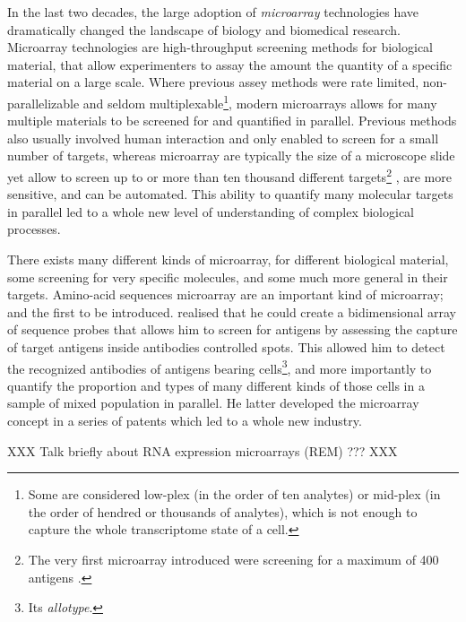 	In the last two decades, the large adoption of \emph{microarray} technologies have dramatically changed the landscape of biology and biomedical research.
	Microarray technologies are high-throughput screening methods for biological material, that allow experimenters to assay the amount the quantity of a specific material on a large scale.
	Where previous assey methods were rate limited, non-parallelizable and seldom multiplexable\footnote{Some are considered low-plex (in the order of ten analytes) or mid-plex (in the order of hendred or thousands of analytes), which is not enough to capture the whole transcriptome state of a cell.}, modern microarrays allows for many multiple materials to be screened for and quantified in parallel.
	Previous methods also usually involved human interaction and only enabled to screen for a small number of targets, whereas microarray are typically the size of a microscope slide yet allow to screen up to or more than ten thousand different targets\footnote{The very first microarray introduced were screening for a maximum of 400 antigens \parencite{chang1983binding}.} \parencites{smyth2005use}{sealfon2011rna}, are more sensitive, and can be automated.
	This ability to quantify many molecular targets in parallel led to a whole new level of understanding of complex biological processes.

	There exists many different kinds of microarray, for different biological material, some screening for very specific molecules, and some much more general in their targets.
	Amino-acid sequences microarray are an important kind of microarray; and the first to be introduced.
	\Textcite{chang1983binding} realised that he could create a bidimensional array of sequence probes that allows him to screen for antigens by assessing the capture of target antigens inside antibodies controlled spots.
	This allowed him to detect the recognized antibodies of antigens bearing cells\footnote{Its \emph{allotype}.}, and more importantly to quantify the proportion and types of many different kinds of those cells in a sample of mixed population in parallel.
	He latter developed the microarray concept in a series of patents \parencites{chang1986matrix}{chang1989immunoassay}{chang1992antibody} which led to a whole new industry.

	XXX Talk briefly about RNA expression microarrays (REM) ??? XXX

